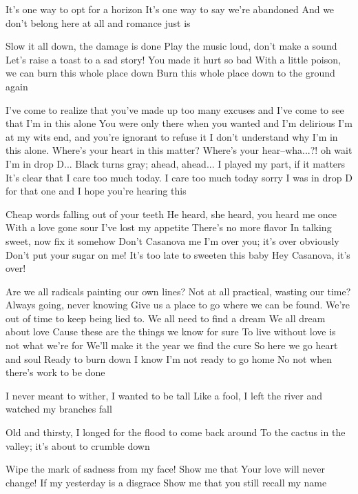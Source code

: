 It's one way to opt for a horizon
It's one way to say we're abandoned
And we don't belong here at all
and romance just is

Slow it all down, the damage is done
Play the music loud, don't make a sound
Let's raise a toast to a sad story!
You made it hurt so bad
With a little poison, we can burn this whole place down
Burn this whole place down to the ground again


I've come to realize that you've made up too many excuses
and I've come to see that I'm in this alone
You were only there when you wanted and I'm delirious
I'm at my wits end, and you're ignorant to refuse it
I don't understand why I'm in this alone.
Where's your heart in this matter?
Where's your hear--wha...?! oh wait I'm in drop D...
Black turns gray; ahead, ahead...
I played my part, if it matters
It's clear that I care too much today.
I care too much today
sorry I was in drop D for that one
and I hope you're hearing this


Cheap words falling out of your teeth
He heard, she heard, you heard me once
With a love gone sour
I've lost my appetite
There's no more flavor
In talking sweet, now fix it somehow
Don't Casanova me
I'm over you; it's over obviously
Don't put your sugar on me!
It's too late to sweeten this baby
Hey Casanova, it's over!


Are we all radicals painting our own lines?
Not at all practical, wasting our time?
Always going, never knowing
Give us a place to go where we can be found.
We're out of time to keep being lied to.
We all need to find a dream
We all dream about love
Cause these are the things we know for sure
To live without love is not what we're for
We'll make it the year we find the cure
So here we go heart and soul
Ready to burn down
I know I'm not ready to go home
No not when there's work to be done


I never meant to wither, I wanted to be tall
Like a fool, I left the river and watched my branches fall

Old and thirsty, I longed for the flood to come back around
To the cactus in the valley; it's about to crumble down

Wipe the mark of sadness from my face!
Show me that Your love will never change!
If my yesterday is a disgrace
Show me that you still recall my name

